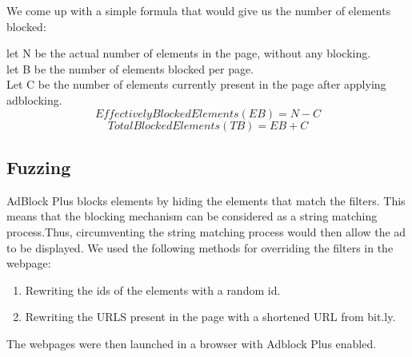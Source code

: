 We come  up with a simple formula that would give us the number of elements blocked:

let N be the actual number of elements  in the page, without any blocking. \\
let B be the number of elements blocked per page.\\
Let C be the  number of elements currently present in the page after applying adblocking. \\
\begin{equation}
Effectively Blocked Elements (EB) = N - C
\end{equation}
\begin{equation}
 Total Blocked Elements (TB) = EB + C
\end{equation}
\subsection{Fuzzing}
AdBlock Plus blocks elements by hiding the elements that match the filters. This means that the blocking mechanism can be considered as a string matching process.Thus, circumventing the string matching process would then allow the ad to be displayed. We used the following methods for overriding the filters in the webpage:
\begin{enumerate}
  \item  Rewriting the ids of the elements with a random id.
  \item  Rewriting the URLS present in the page  with a shortened URL from bit.ly.
\end{enumerate}
 The webpages were then launched in a browser with Adblock Plus enabled.









